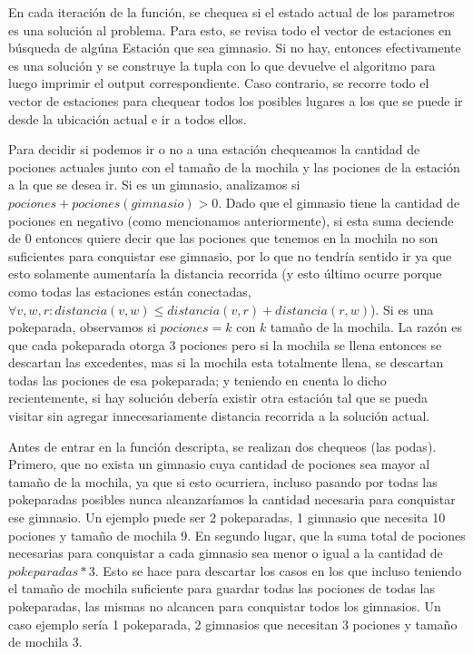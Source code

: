             En cada iteración de la función, se chequea si el estado actual de los parametros es una solución al problema. Para esto, se revisa todo el vector de estaciones en búsqueda de algúna Estación que sea gimnasio. Si no hay, entonces efectivamente es una solución y se construye la tupla con lo que devuelve el algoritmo para luego imprimir el output correspondiente. Caso contrario, se recorre todo el vector de estaciones para chequear todos los posibles lugares a los que se puede ir desde la ubicación actual e ir a todos ellos.

            Para decidir si podemos ir o no a una estación chequeamos la cantidad de pociones actuales junto con el tamaño de la mochila y las pociones de la estación a la que se desea ir. Si es un gimnasio, analizamos si $pociones + pociones(gimnasio) > 0$. Dado que el gimnasio tiene la cantidad de pociones en negativo (como mencionamos anteriormente), si esta suma deciende de 0 entonces quiere decir que las pociones que tenemos en la mochila no son suficientes para conquistar ese gimnasio, por lo que no tendría sentido ir ya que esto solamente aumentaría la distancia recorrida (y esto último ocurre porque como todas las estaciones están conectadas,  $\forall v,w,r : distancia(v,w) \leq distancia(v,r) + distancia(r,w)$). Si es una pokeparada, observamos si $pociones = k$ con $k$ tamaño de la mochila. La razón es que cada pokeparada otorga 3 pociones pero si la mochila se llena entonces se descartan las excedentes, mas si la mochila esta totalmente llena, se descartan todas las pociones de esa pokeparada; y teniendo en cuenta lo dicho recientemente, si hay solución debería existir otra estación tal que se pueda visitar sin agregar innecesariamente distancia recorrida a la solución actual.

            Antes de entrar en la función descripta, se realizan dos chequeos (las podas). Primero, que no exista un gimnasio cuya cantidad de pociones sea mayor al tamaño de la mochila, ya que si esto ocurriera, incluso pasando por todas las pokeparadas posibles nunca alcanzaríamos la cantidad necesaria para conquistar ese gimnasio. Un ejemplo puede ser 2 pokeparadas, 1 gimnasio que necesita 10 pociones y tamaño de mochila 9. En segundo lugar, que la suma total de pociones necesarias para conquistar a cada gimnasio sea menor o igual a la cantidad de $pokeparadas*3$. Esto se hace para descartar los casos en los que incluso teniendo el tamaño de mochila suficiente para guardar todas las pociones de todas las pokeparadas, las mismas no alcancen para conquistar todos los gimnasios. Un caso ejemplo sería 1 pokeparada, 2 gimnasios que necesitan 3 pociones y tamaño de mochila 3.


